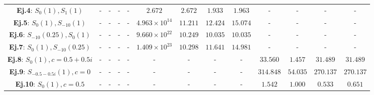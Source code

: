 \begin{table}
\begin{tabular}{|c|cccc|cccc|cccc|}
		\textbf{Ej.4}: $S_{0}(1), S_{1}(1)$      & -                                             & -                                                & -                                   & -        & $2.672$                & $2.672$        & $1.933$                 & $1.963$  & -                      & -              & -                       & -          \\
		\textbf{Ej.5}: $S_{0}(1), S_{-10}(1)$    & -                                             & -                                                & -                                   & -        & $4.963 \times 10^{14}$ & $11.211$       & $12.424$                & $15.074$ & -                      & -              & -                       & -          \\
		\textbf{Ej.6}: $S_{-10}(0.25), S_{0}(1)$ & -                                             & -                                                & -                                   & -        & $9.660 \times 10^{22}$ & $10.249$       & $10.035$                & $10.035$ & -                      & -              & -                       & -          \\
		\textbf{Ej.7}: $S_{0}(1), S_{-10}(0.25)$ & -                                             & -                                                & -                                   & -        & $1.409 \times 10^{23}$ & $10.298$       & $11.641$                & $14.981$ & -                      & -              & -                       & -          \\
		\textbf{Ej.8}: $S_{0}(1), c=0.5+0.5i$    & -                                             & -                                                & -                                   & -        & -                      & -              & -                       & -        & $33.560$               & $1.457$        & $31.489$                & $31.489$   \\
		\textbf{Ej.9}: $S_{-0.5-0.5i}(1), c=0$   & -                                             & -                                                & -                                   & -        & -                      & -              & -                       & -        & $314.848$              & $54.035$       & $270.137$               & $270.137$  \\
		\textbf{Ej.10}: $S_{0}(1), c=0.5$        & -                                             & -                                                & -                                   & -        & -                      & -              & -                       & -        & $1.542$                & $1.000$        & $0.533$                 & $0.651$    \\

\end{tabular}
\end{table}
